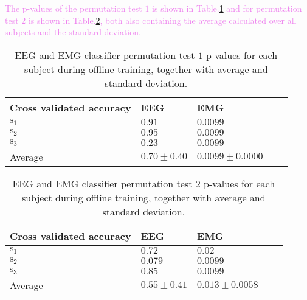 \textcolor{violet}{The p-values of the permutation test $1$ is shown in Table.\:\ref{tab:classifier_test1} and for permutation test $2$ is shown in Table.\:\ref{tab:classifier_test2}, both also containing the average calculated over all subjects and the standard deviation.}
\begin{table}[ht]
	\centering
	\begin{tabular}{|l|l|l|l|l|}
			\hline
			Cross validated accuracy         & EEG                   & EMG                       \\
			\hline
			$\text{s}_1$                     & $0.91$                & $0.0099$                  \\
			$\text{s}_2$                     & $0.95$                & $0.0099$                  \\
			$\text{s}_3$                     & $0.23$                & $0.0099$                  \\
			Average                          & $0.70 \pm 0.40$       & $0.0099 \pm 0.0000$       \\
			\hline
		\end{tabular}
	\caption{EEG and EMG classifier permutation test $1$ p-values for each subject during offline training, together with average and standard deviation.}
	\label{tab:classifier_test1}
\end{table}
\begin{table}[ht]
	\centering
	\begin{tabular}{|l|l|l|l|l|}
			\hline
			Cross validated accuracy         & EEG                   & EMG                    \\
			\hline
			$\text{s}_1$                     & $0.72$                & $0.02$                 \\
			$\text{s}_2$                     & $0.079$               & $0.0099$               \\
			$\text{s}_3$                     & $0.85$                & $0.0099$               \\
			Average                          & $0.55 \pm 0.41$       & $0.013 \pm 0.0058$     \\
			\hline
		\end{tabular}
	\caption{EEG and EMG classifier permutation test $2$ p-values for each subject during offline training, together with average and standard deviation.}
	\label{tab:classifier_test2}
\end{table}

